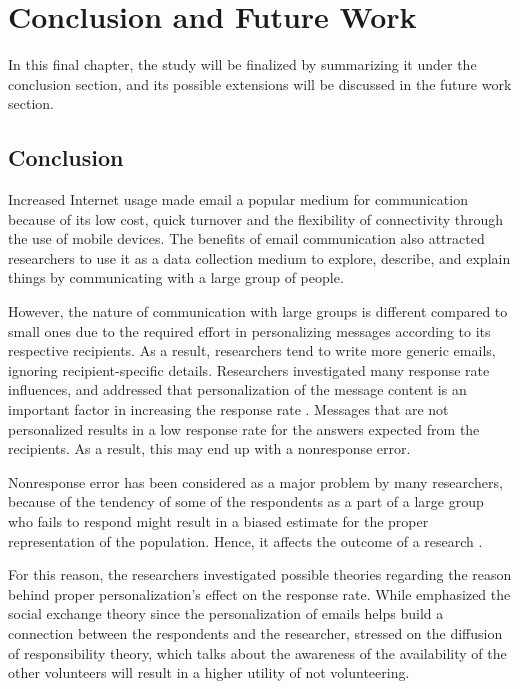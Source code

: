 \chapter{Conclusion and Future Work}
\label{chp:6:ConcFutu}

In this final chapter, the study will be finalized by summarizing it under the conclusion section, and its possible extensions will be discussed in the future work section.

\section{Conclusion}
\label{sec:6.1:Conc}

Increased Internet usage made email a popular medium for communication because of its low cost, quick turnover and the flexibility of connectivity through the use of mobile devices. The benefits of email communication also attracted researchers to use it as a data collection medium to explore, describe, and explain things by communicating with a large group of people.
\vspace{1cm}

However, the nature of communication with large groups is different compared to small ones due to the required effort in personalizing messages according to its respective recipients. As a result, researchers tend to write more generic emails, ignoring recipient-specific details. Researchers investigated many response rate influences, and addressed that personalization of the message content is an important factor in increasing the response rate \citep{Dillman1991,Schaefer1998}. Messages that are not personalized results in a low response rate for the answers expected from the recipients. As a result, this may end up with a nonresponse error.
\vspace{1cm}

Nonresponse error has been considered as a major problem by many researchers, because of the tendency of some of the respondents as a part of a large group who fails to respond might result in a biased estimate for the proper representation of the population. Hence, it affects the outcome of a research \citep{Bogen1996}.
\vspace{1cm}

For this reason, the researchers investigated possible theories regarding the reason behind proper personalization's effect on the response rate. While \cite{DillmanDonA.SmythJoleneD.Christian2009} emphasized the social exchange theory since the personalization of emails helps build a connection between the respondents and the researcher, \cite{Barron2002} stressed on the diffusion of responsibility theory, which talks about the awareness of the availability of the other volunteers will result in a higher utility of not volunteering.
\vspace{1cm}

